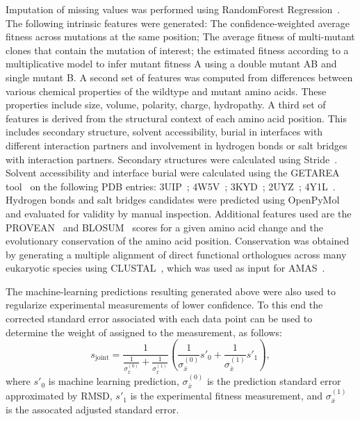 Imputation of missing values was performed using RandomForest Regression~\cite{breiman_random_2001}. The following intrinsic features were generated: The confidence-weighted average fitness across mutations at the same position; The average fitness of multi-mutant clones that contain the mutation of interest; the estimated fitness according to a multiplicative model to infer mutant fitness A using a double mutant AB and single mutant B.
A second set of features was computed from differences between various chemical properties of the wildtype and mutant amino acids. These properties include size, volume, polarity, charge, hydropathy.
A third set of features is derived from the structural context of each amino acid position. This includes secondary structure, solvent accessibility, burial in interfaces with different interaction partners and involvement in hydrogen bonds or salt bridges with interaction partners. Secondary structures were calculated using Stride~\cite{frishman_knowledge-based_1995}. Solvent accessibility and interface burial were calculated using the GETAREA tool~\cite{fraczkiewicz_exact_1998} on the following PDB entries: 3UIP~\cite{gareau_determinants_2012}; 4W5V~\cite{reiter_characterization_2016}; 3KYD~\cite{olsen_active_2010}; 2UYZ~\cite{knipscheer_noncovalent_2007}; 4Y1L~\cite{alontaga_rwd_2015}. Hydrogen bonds and salt bridges candidates were predicted using OpenPyMol~\cite{schrodinger_pymol_2016} and evaluated for validity by manual inspection.
Additional features used are the PROVEAN~\cite{choi_predicting_2012} and BLOSUM~\cite{henikoff_amino_1992} scores for a given amino acid change and the evolutionary conservation of the amino acid position. Conservation was obtained by generating a multiple alignment of direct functional orthologues across many eukaryotic species using CLUSTAL~\cite{russell_clustal_2014}, which was used as input for AMAS~\cite{livingstone_protein_1993}.

The machine-learning predictions resulting generated above were also used to regularize experimental measurements of lower confidence. To this end the corrected standard error associated with each data point can be used to determine the weight of assigned to the measurement, as follows:
$$s_\text{joint} = \frac{1}{\frac{1}{\sigma_{\bar x}^{(0)}}+\frac{1}{\sigma_{\bar x}^{(1)}}}(\frac{1}{\sigma_{\bar x}^{(0)}} s'_0 + \frac{1}{\sigma_{\bar x}^{(1)}}s'_1),$$
where $s'_0$ is machine learning prediction, $\sigma_{\bar x}^{(0)}$ is the prediction standard error approximated by RMSD, $s'_1$ is the experimental fitness measurement, and $\sigma_{\bar x}^{(1)}$ is the assocated adjusted standard error.

